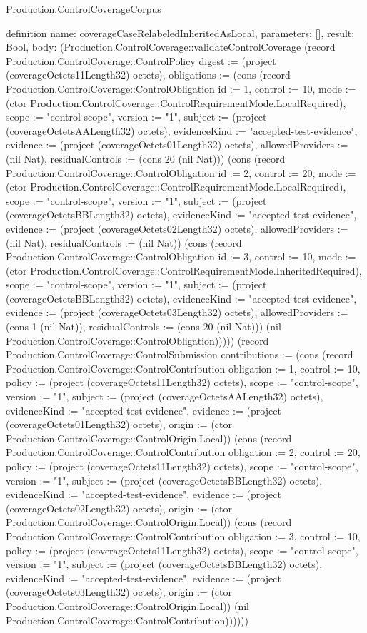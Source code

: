 \begin{lexlean}{Production.ControlCoverageCorpus}
\begin{semanticmodule}
definition{
  name: coverageCaseRelabeledInheritedAsLocal,
  parameters: [],
  result: Bool,
  body: (Production.ControlCoverage::validateControlCoverage (record Production.ControlCoverage::ControlPolicy {digest := (project (coverageOctets11Length32) octets), obligations := (cons (record Production.ControlCoverage::ControlObligation {id := 1, control := 10, mode := (ctor Production.ControlCoverage::ControlRequirementMode.LocalRequired), scope := "control-scope", version := "1", subject := (project (coverageOctetsAALength32) octets), evidenceKind := "accepted-test-evidence", evidence := (project (coverageOctets01Length32) octets), allowedProviders := (nil Nat), residualControls := (cons 20 (nil Nat))}) (cons (record Production.ControlCoverage::ControlObligation {id := 2, control := 20, mode := (ctor Production.ControlCoverage::ControlRequirementMode.LocalRequired), scope := "control-scope", version := "1", subject := (project (coverageOctetsBBLength32) octets), evidenceKind := "accepted-test-evidence", evidence := (project (coverageOctets02Length32) octets), allowedProviders := (nil Nat), residualControls := (nil Nat)}) (cons (record Production.ControlCoverage::ControlObligation {id := 3, control := 10, mode := (ctor Production.ControlCoverage::ControlRequirementMode.InheritedRequired), scope := "control-scope", version := "1", subject := (project (coverageOctetsBBLength32) octets), evidenceKind := "accepted-test-evidence", evidence := (project (coverageOctets03Length32) octets), allowedProviders := (cons 1 (nil Nat)), residualControls := (cons 20 (nil Nat))}) (nil Production.ControlCoverage::ControlObligation))))}) (record Production.ControlCoverage::ControlSubmission {contributions := (cons (record Production.ControlCoverage::ControlContribution {obligation := 1, control := 10, policy := (project (coverageOctets11Length32) octets), scope := "control-scope", version := "1", subject := (project (coverageOctetsAALength32) octets), evidenceKind := "accepted-test-evidence", evidence := (project (coverageOctets01Length32) octets), origin := (ctor Production.ControlCoverage::ControlOrigin.Local)}) (cons (record Production.ControlCoverage::ControlContribution {obligation := 2, control := 20, policy := (project (coverageOctets11Length32) octets), scope := "control-scope", version := "1", subject := (project (coverageOctetsBBLength32) octets), evidenceKind := "accepted-test-evidence", evidence := (project (coverageOctets02Length32) octets), origin := (ctor Production.ControlCoverage::ControlOrigin.Local)}) (cons (record Production.ControlCoverage::ControlContribution {obligation := 3, control := 10, policy := (project (coverageOctets11Length32) octets), scope := "control-scope", version := "1", subject := (project (coverageOctetsBBLength32) octets), evidenceKind := "accepted-test-evidence", evidence := (project (coverageOctets03Length32) octets), origin := (ctor Production.ControlCoverage::ControlOrigin.Local)}) (nil Production.ControlCoverage::ControlContribution))))}))
}


\end{semanticmodule}
\end{lexlean}
